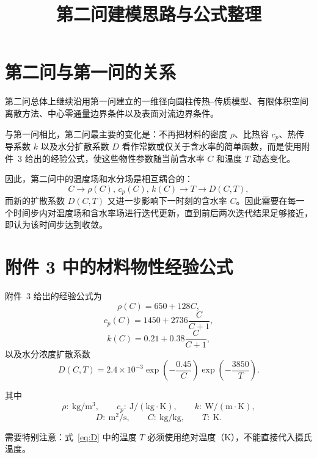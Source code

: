 \documentclass[UTF8,a4paper,12pt]{ctexart}
\title{第二问建模思路与公式整理}
\author{}
\date{}
\begin{document}
\maketitle

\section{第二问与第一问的关系}

第二问总体上继续沿用第一问建立的一维径向圆柱传热--传质模型、有限体积空间离散方法、中心零通量边界条件以及表面对流边界条件。

与第一问相比，第二问最主要的变化是：不再把材料的密度 $\rho$、比热容 $c_p$、热传导系数 $k$ 以及水分扩散系数 $D$ 看作常数或仅关于含水率的简单函数，而是使用附件~3 给出的经验公式，使这些物性参数随当前含水率 $C$ 和温度 $T$ 动态变化。

因此，第二问中的温度场和水分场是相互耦合的：
\[
C
\longrightarrow
\rho(C),\,c_p(C),\,k(C)
\longrightarrow
T
\longrightarrow
D(C,T),
\]
而新的扩散系数 $D(C,T)$ 又进一步影响下一时刻的含水率 $C$。因此需要在每一个时间步内对温度场和含水率场进行迭代更新，直到前后两次迭代结果足够接近，即认为该时间步达到收敛。

\section{附件 3 中的材料物性经验公式}

附件~3 给出的经验公式为
\begin{equation}
    \rho(C)=650+128C,
    \label{eq:rho}
\end{equation}
\begin{equation}
    c_p(C)=1450+2736\frac{C}{C+1},
    \label{eq:cp}
\end{equation}
\begin{equation}
    k(C)=0.21+0.38\frac{C}{C+1},
    \label{eq:k}
\end{equation}
以及水分浓度扩散系数
\begin{equation}
    D(C,T)
    =
    2.4\times10^{-3}
    \exp\!\left(-\frac{0.45}{C}\right)
    \exp\!\left(-\frac{3850}{T}\right).
    \label{eq:D}
\end{equation}

其中
\[
\rho:\ \mathrm{kg/m^3},\qquad
c_p:\ \mathrm{J/(kg\cdot K)},\qquad
k:\ \mathrm{W/(m\cdot K)},
\]
\[
D:\ \mathrm{m^2/s},\qquad
C:\ \mathrm{kg/kg},\qquad
T:\ \mathrm{K}.
\]

需要特别注意：式~\eqref{eq:D} 中的温度 $T$ 必须使用绝对温度（K），不能直接代入摄氏温度。
\end{document}
